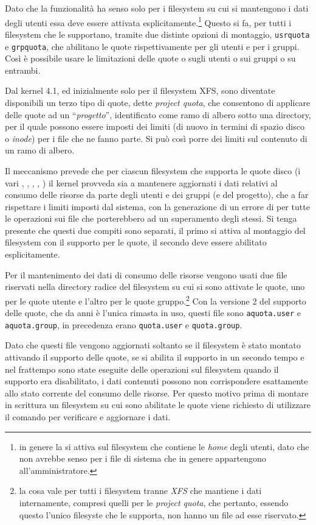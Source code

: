 Dato che la funzionalità ha senso solo per i filesystem su cui si mantengono i
dati degli utenti essa deve essere attivata esplicitamente.\footnote{in genere
  la si attiva sul filesystem che contiene le \textit{home} degli utenti, dato
  che non avrebbe senso per i file di sistema che in genere appartengono
  all'amministratore.} Questo si fa, per tutti i filesystem che le supportano,
tramite due distinte opzioni di montaggio, \texttt{usrquota} e
\texttt{grpquota}, che abilitano le quote rispettivamente per gli utenti e per
i gruppi. Così è possibile usare le limitazioni delle quote o sugli utenti o
sui gruppi o su entrambi.

Dal kernel 4.1, ed inizialmente solo per il filesystem XFS, sono diventate
disponibili un terzo tipo di quote, dette \textit{project quota}, che
consentono di applicare delle quote ad un ``\textsl{progetto}'', identificato
come ramo di albero sotto una directory, per il quale possono essere imposti
dei limiti (di nuovo in termini di spazio disco o \textit{inode}) per i file
che ne fanno parte. Si può così porre dei limiti sul contenuto di un ramo di
albero.

Il meccanismo prevede che per ciascun filesystem che supporta le quote disco
(i vari , , , , ) il
kernel provveda sia a mantenere aggiornati i dati relativi al consumo delle
risorse da parte degli utenti e dei gruppi (e del progetto), che a far
rispettare i limiti imposti dal sistema, con la generazione di un errore di
 per tutte le operazioni sui file che porterebbero ad un
superamento degli stessi. Si tenga presente che questi due compiti sono
separati, il primo si attiva al montaggio del filesystem con il supporto per
le quote, il secondo deve essere abilitato esplicitamente.

Per il mantenimento dei dati di consumo delle risorse vengono usati due file
riservati nella directory radice del filesystem su cui si sono attivate le
quote, uno per le quote utente e l'altro per le quote gruppo.\footnote{la cosa
  vale per tutti i filesystem tranne \textit{XFS} che mantiene i dati
  internamente, compresi quelli per le \textit{project quota}, che pertanto,
  essendo questo l'unico filesyste che le supporta, non hanno un file ad esse
  riservato.} Con la versione 2 del supporto delle quote, che da anni è
l'unica rimasta in uso, questi file sono \texttt{aquota.user} e
\texttt{aquota.group}, in precedenza erano \texttt{quota.user} e
\texttt{quota.group}.

Dato che questi file vengono aggiornati soltanto se il filesystem è stato
montato attivando il supporto delle quote, se si abilita il supporto in un
secondo tempo e nel frattempo sono state eseguite delle operazioni sul
filesystem quando il supporto era disabilitato, i dati contenuti possono non
corrispondere esattamente allo stato corrente del consumo delle risorse. Per
questo motivo prima di montare in scrittura un filesystem su cui sono
abilitate le quote viene richiesto di utilizzare il comando 
per verificare e aggiornare i dati.


